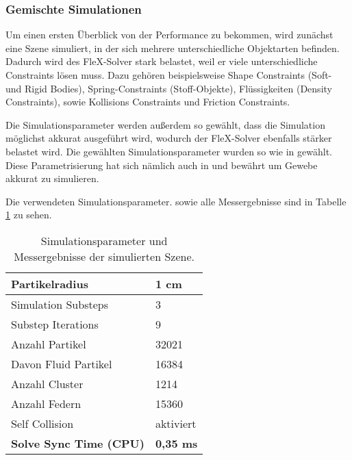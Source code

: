 \subsubsection{Gemischte Simulationen}

Um einen ersten Überblick von der Performance zu bekommen, wird zunächst eine Szene simuliert, in der sich mehrere unterschiedliche Objektarten befinden. Dadurch wird des FleX-Solver stark belastet, weil er viele unterschiedliche Constraints lösen muss. Dazu gehören beispielsweise Shape Constraints (Soft- und Rigid Bodies), Spring-Constraints (Stoff-Objekte), Flüssigkeiten (Density Constraints), sowie Kollisions Constraints und Friction Constraints.



Die Simulationsparameter werden außerdem so gewählt, dass die Simulation möglichst akkurat ausgeführt wird, wodurch der FleX-Solver ebenfalls stärker belastet wird. Die gewählten Simulationsparameter wurden so wie in \cite{BreastBiopsy} gewählt. Diese Parametrisierung hat sich nämlich auch in \cite{PBDKidney} und \cite{VRSim20} bewährt um Gewebe akkurat zu simulieren.

Die verwendeten Simulationsparameter. sowie alle Messergebnisse sind in Tabelle \ref{table_mixed_sim} zu sehen.

\begin{table}[]
\centering
\caption{Simulationsparameter und Messergebnisse der simulierten Szene.}
\label{table_mixed_sim}
\begin{tabular}{l|l}
 \hline
Partikelradius & 1 cm  \\ \hline
Simulation Substeps & 3      \\ \hline
Substep Iterations & 9            \\ \hline
Anzahl Partikel & 32021            \\ \hline
Davon Fluid Partikel & 16384	\\ \hline
Anzahl Cluster & 1214		\\ \hline
Anzahl Federn & 15360 		\\ \hline
Self Collision & aktiviert \\ \hline%
\textbf{Solve Sync Time (CPU)} & \textbf{0,35 ms}
\end{tabular}
\end{table}

